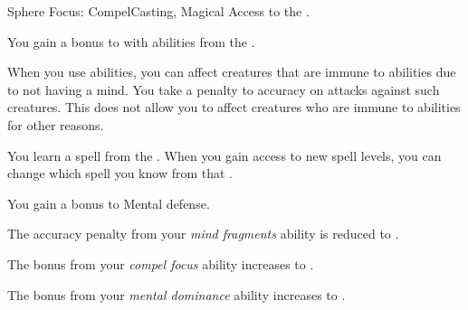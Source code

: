     \begin{feat}{Sphere Focus: Compel}{Casting, Magical}
        \featpre Access to the  .

         You gain a  bonus to  with abilities from the  .

         When you use  abilities, you can affect creatures that are immune to  abilities due to not having a mind.
        You take a  penalty to accuracy on attacks against such creatures.
        This does not allow you to affect creatures who are immune to  abilities for other reasons.

         You learn a spell from the  .
        When you gain access to new spell levels, you can change which spell you know from that .

         You gain a  bonus to Mental defense.

         The accuracy penalty from your \textit{mind fragments} ability is reduced to .

         The bonus from your \textit{compel focus} ability increases to .

         The bonus from your \textit{mental dominance} ability increases to .
    \end{feat}

